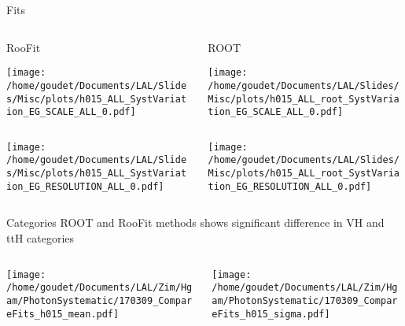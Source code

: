 \documentclass[bigger]{beamer}
\begin{document}
\begin{frame}[label={sec:orgb852827}]{Fits}
\begin{columns}
\begin{column}{0.45\columnwidth}
\begin{center}RooFit\end{center}
\begin{center}
\texttt{[image: /home/goudet/Documents/LAL/Slides/Misc/plots/h015\_ALL\_SystVariation\_EG\_SCALE\_ALL\_0.pdf]}
\end{center}
\end{column}

\begin{column}{0.45\columnwidth}
\begin{center}ROOT\end{center}
\begin{center}
\texttt{[image: /home/goudet/Documents/LAL/Slides/Misc/plots/h015\_ALL\_root\_SystVariation\_EG\_SCALE\_ALL\_0.pdf]}
\end{center}
\end{column}
\end{columns}
\begin{columns}
\begin{column}{0.45\columnwidth}
\begin{center}
\texttt{[image: /home/goudet/Documents/LAL/Slides/Misc/plots/h015\_ALL\_SystVariation\_EG\_RESOLUTION\_ALL\_0.pdf]}
\end{center}
\end{column}
\begin{column}{0.45\columnwidth}
\begin{center}
\texttt{[image: /home/goudet/Documents/LAL/Slides/Misc/plots/h015\_ALL\_root\_SystVariation\_EG\_RESOLUTION\_ALL\_0.pdf]}
\end{center}
\end{column}
\end{columns}
\end{frame}
\begin{frame}[label={sec:orgb38dd87}]{Categories}
ROOT and RooFit methods shows significant difference in VH and ttH categories
\begin{columns}
\begin{column}{0.5\columnwidth}
\begin{center}
\texttt{[image: /home/goudet/Documents/LAL/Zim/Hgam/PhotonSystematic/170309\_CompareFits\_h015\_mean.pdf]}
\end{center}
\end{column}



\begin{column}{0.5\columnwidth}
\begin{center}
\texttt{[image: /home/goudet/Documents/LAL/Zim/Hgam/PhotonSystematic/170309\_CompareFits\_h015\_sigma.pdf]}
\end{center}
\end{column}
\end{columns}
\end{frame}
\end{document}
